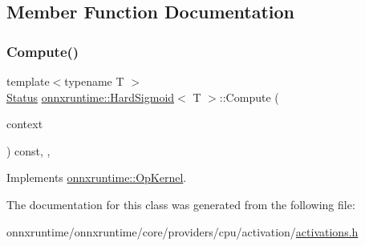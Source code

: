 \subsection{Member Function Documentation}
\mbox{\label{classonnxruntime_1_1HardSigmoid_a498e99535c99b871d25dab8879b25b1e}} 
\subsubsection{\texorpdfstring{Compute()}{Compute()}}
{\footnotesize\ttfamily template$<$typename T $>$ \\
\mbox{\hyperlink{classonnxruntime_1_1common_1_1Status}{Status}} \mbox{\hyperlink{classonnxruntime_1_1HardSigmoid}{onnxruntime\+::\+Hard\+Sigmoid}}$<$ T $>$\+::Compute (\begin{DoxyParamCaption}\item[{\mbox{\hyperlink{classonnxruntime_1_1OpKernelContext}{Op\+Kernel\+Context}} $\ast$}]{context }\end{DoxyParamCaption}) const\hspace{0.3cm}{\ttfamily [inline]}, {\ttfamily [override]}, {\ttfamily [virtual]}}



Implements \mbox{\hyperlink{classonnxruntime_1_1OpKernel_a9eca8656a78b1b3ab9d3351a12798650}{onnxruntime\+::\+Op\+Kernel}}.



The documentation for this class was generated from the following file\+:\begin{DoxyCompactItemize}
\item 
onnxruntime/onnxruntime/core/providers/cpu/activation/\mbox{\hyperlink{cpu_2activation_2activations_8h}{activations.\+h}}\end{DoxyCompactItemize}

